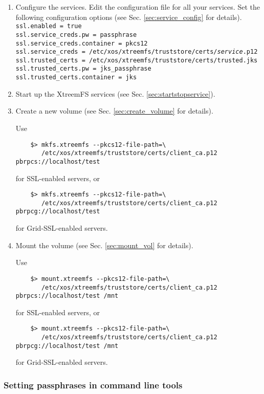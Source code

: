 \documentclass[a4paper,10pt]{book}
\begin{document}
\begin{enumerate}
 \item Configure the services.
	Edit the configuration file for all your services. Set the following configuration options (see Sec. \ref{sec:service_config} for details).\\
	\texttt{ssl.enabled = true}\\
	\texttt{ssl.service\_creds.pw = passphrase}\\
	\texttt{ssl.service\_creds.container = pkcs12}\\
	\texttt{ssl.service\_creds = /etc/xos/xtreemfs/truststore/certs/\textit{service}.p12}\\
	\texttt{ssl.trusted\_certs = /etc/xos/xtreemfs/truststore/certs/trusted.jks}\\
	\texttt{ssl.trusted\_certs.pw = jks\_passphrase}\\
	\texttt{ssl.trusted\_certs.container = jks}
 \item Start up the XtreemFS services (see Sec. \ref{sec:startstopservice}).
 \item Create a new volume (see Sec. \ref{sec:create_volume} for details).

	Use
	\begin{verbatim}
	$> mkfs.xtreemfs --pkcs12-file-path=\
	   /etc/xos/xtreemfs/truststore/certs/client_ca.p12 pbrpcs://localhost/test
	\end{verbatim}
	for SSL-enabled servers, or
	\begin{verbatim}
	$> mkfs.xtreemfs --pkcs12-file-path=\
	   /etc/xos/xtreemfs/truststore/certs/client_ca.p12 pbrpcg://localhost/test
	\end{verbatim}
	for Grid-SSL-enabled servers.

 \item Mount the volume (see Sec. \ref{sec:mount_vol} for details).

	Use
	\begin{verbatim}
	$> mount.xtreemfs --pkcs12-file-path=\
	   /etc/xos/xtreemfs/truststore/certs/client_ca.p12 pbrpcs://localhost/test /mnt
	\end{verbatim}
	for SSL-enabled servers, or
	\begin{verbatim}
	$> mount.xtreemfs --pkcs12-file-path=\
	   /etc/xos/xtreemfs/truststore/certs/client_ca.p12 pbrpcg://localhost/test /mnt
	\end{verbatim}
	for Grid-SSL-enabled servers.

\end{enumerate}

\subsubsection{Setting passphrases in command line tools}
\end{document}
